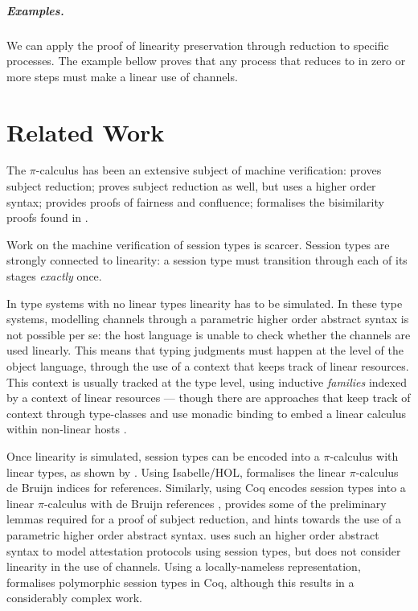 \documentclass{mproj}
\newcommand{\picalc}{$\pi$-calculus}
\begin{document}
\paragraph{Examples.}
We can apply the proof of linearity preservation through reduction to specific processes. The example bellow proves that any process that  reduces to in zero or more steps must make a linear use of channels.


\chapter{Related Work}\label{related-work}

The \picalc{} has been an extensive subject of machine verification: \cite{Henry-Gerard1999} proves subject reduction; \cite{Despeyroux2000} proves subject reduction as well, but uses a higher order syntax; \cite{Affeldt2008} provides proofs of fairness and confluence; \cite{Honsell2001} formalises the bisimilarity proofs found in \cite{Walker1989}.

Work on the machine verification of session types is scarcer.  Session types are strongly connected to linearity: a session type must transition through each of its stages \emph{exactly} once.

In type systems with no linear types linearity has to be simulated. In these type systems, modelling channels through a parametric higher order abstract syntax \cite{Chlipala2008} is not possible per se: the host language is unable to check whether the channels are used linearly. This means that typing judgments must happen at the level of the object language, through the use of a context that keeps track of linear resources.  This context is usually tracked at the type level, using inductive \emph{families} \cite{Dybjer1994} indexed by a context of linear resources \cite{Power2000} --- though there are approaches that keep track of context through type-classes and use monadic binding to embed a linear calculus within non-linear hosts \cite{Paykin2017}. 

Once linearity is simulated, session types can be encoded into a \picalc{} with linear types, as shown by \cite{Kobayashi1996,Dardha2012,Dardha2017}. Using Isabelle/HOL, \cite{Gay2001} formalises the linear \picalc{} de Bruijn indices \cite{deBruijn1972} for references. Similarly, using Coq \cite{Dilmore2019} encodes session types into a linear \picalc{} with de Bruijn references , provides some of the preliminary lemmas required for a proof of subject reduction, and hints towards the use of a parametric higher order abstract syntax. \cite{Petz} uses such an higher order abstract syntax to model attestation protocols using session types, but does not consider linearity in the use of channels. Using a locally-nameless \cite{Chargueraud2012} representation, \cite{Goto2016} formalises polymorphic session types in Coq, although this results in a considerably complex work.
\end{document}
